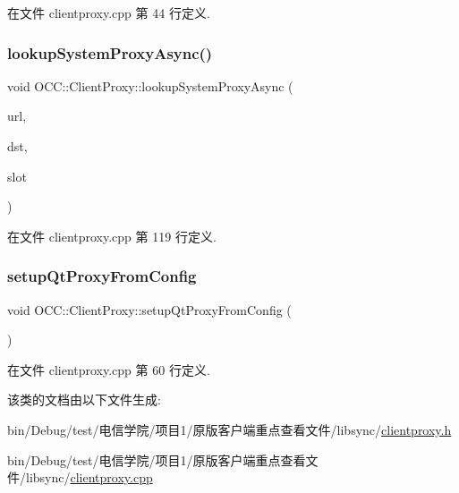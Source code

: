 在文件 clientproxy.\+cpp 第 44 行定义.

\mbox{\label{class_o_c_c_1_1_client_proxy_aecedffefc443606bc8565ad3b95b176b}} 
\subsubsection{\texorpdfstring{lookup\+System\+Proxy\+Async()}{lookupSystemProxyAsync()}}
{\footnotesize\ttfamily void O\+C\+C\+::\+Client\+Proxy\+::lookup\+System\+Proxy\+Async (\begin{DoxyParamCaption}\item[{const Q\+Url \&}]{url,  }\item[{Q\+Object $\ast$}]{dst,  }\item[{const char $\ast$}]{slot }\end{DoxyParamCaption})\hspace{0.3cm}{\ttfamily [static]}}



在文件 clientproxy.\+cpp 第 119 行定义.

\mbox{\label{class_o_c_c_1_1_client_proxy_a2c371c059407a4d47cbd792f61211d34}} 
\subsubsection{\texorpdfstring{setup\+Qt\+Proxy\+From\+Config}{setupQtProxyFromConfig}}
{\footnotesize\ttfamily void O\+C\+C\+::\+Client\+Proxy\+::setup\+Qt\+Proxy\+From\+Config (\begin{DoxyParamCaption}{ }\end{DoxyParamCaption})\hspace{0.3cm}{\ttfamily [slot]}}



在文件 clientproxy.\+cpp 第 60 行定义.



该类的文档由以下文件生成\+:\begin{DoxyCompactItemize}
\item 
bin/\+Debug/test/电信学院/项目1/原版客户端重点查看文件/libsync/\hyperlink{clientproxy_8h}{clientproxy.\+h}\item 
bin/\+Debug/test/电信学院/项目1/原版客户端重点查看文件/libsync/\hyperlink{clientproxy_8cpp}{clientproxy.\+cpp}\end{DoxyCompactItemize}
